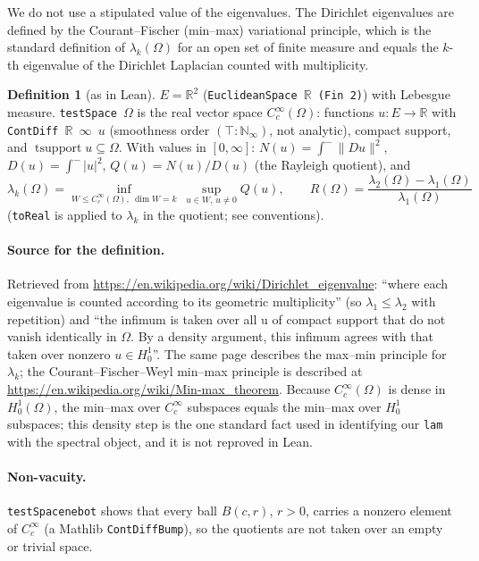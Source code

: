 \documentclass[11pt]{article}
\renewcommand{\_}{\oldus\allowbreak}
\theoremstyle{definition}
\newtheorem{definition}[theorem]{Definition}
\theoremstyle{remark}
\begin{document}
We do not use a stipulated value of the eigenvalues. The Dirichlet eigenvalues are defined by the
Courant--Fischer (min--max) variational principle, which is the standard definition of $\lambda_k(\Omega)$
for an open set of finite measure and equals the $k$-th eigenvalue of the Dirichlet Laplacian counted with
multiplicity.

\begin{definition}[as in Lean]
$E=\mathbb R^2$ (\texttt{EuclideanSpace $\mathbb R$ (Fin 2)}) with Lebesgue measure.
\texttt{testSpace $\Omega$} is the real vector space $C_c^\infty(\Omega)$: functions $u:E\to\mathbb R$ with
\texttt{ContDiff $\mathbb R$ $\infty$ $u$} (smoothness order $(\top:\mathbb N_\infty)$, not analytic),
compact support, and $\operatorname{tsupport}u\subseteq\Omega$.
With values in $[0,\infty]$:
$N(u)=\int^{-}\|Du\|^2$, $D(u)=\int^{-}|u|^2$, $Q(u)=N(u)/D(u)$ (the Rayleigh quotient), and
\[
\lambda_k(\Omega)=\inf_{W\le C_c^\infty(\Omega),\ \dim W=k}\ \sup_{u\in W,\,u\neq 0}Q(u),\qquad
R(\Omega)=\frac{\lambda_2(\Omega)-\lambda_1(\Omega)}{\lambda_1(\Omega)}
\]
(\texttt{toReal} is applied to $\lambda_k$ in the quotient; see conventions).
\end{definition}

\paragraph{Source for the definition.} Retrieved from
\url{https://en.wikipedia.org/wiki/Dirichlet_eigenvalue}:
``where each eigenvalue is counted according to its geometric multiplicity'' (so $\lambda_1\le\lambda_2$ with
repetition) and ``the infimum is taken over all u of compact support that do not vanish identically in
$\Omega$. By a density argument, this infimum agrees with that taken over nonzero $u\in H_0^1$''. The same
page describes the max--min principle for $\lambda_k$; the Courant--Fischer--Weyl min--max principle is
described at \url{https://en.wikipedia.org/wiki/Min-max_theorem}. Because $C_c^\infty(\Omega)$ is dense in
$H_0^1(\Omega)$, the min--max over $C_c^\infty$ subspaces equals the min--max over $H_0^1$ subspaces; this
density step is the one standard fact used in identifying our \texttt{lam} with the spectral object, and it is
not reproved in Lean.

\paragraph{Non-vacuity.} \texttt{testSpace\_ne\_bot} shows that every ball $B(c,r)$, $r>0$, carries a
nonzero element of $C_c^\infty$ (a Mathlib \texttt{ContDiffBump}), so the quotients are not taken over an
empty or trivial space.
\end{document}
